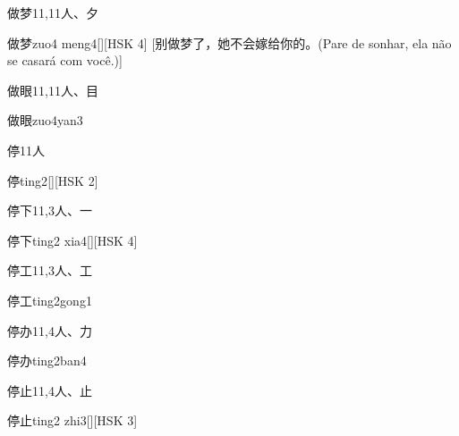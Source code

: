\begin{entry}{做梦}{11,11}{⼈、⼣}
  \begin{phonetics}{做梦}{zuo4 meng4}[][HSK 4]
    [别​做​梦​了​，她​不​会​嫁​给​你​的​。(Pare de sonhar, ela não se casará com você.)]
  \end{phonetics}
\end{entry}

\begin{entry}{做眼}{11,11}{⼈、⽬}
  \begin{phonetics}{做眼}{zuo4yan3}
  \end{phonetics}
\end{entry}

\begin{entry}{停}{11}{⼈}
  \begin{phonetics}{停}{ting2}[][HSK 2]
  \end{phonetics}
\end{entry}

\begin{entry}{停下}{11,3}{⼈、⼀}
  \begin{phonetics}{停下}{ting2 xia4}[][HSK 4]
  \end{phonetics}
\end{entry}

\begin{entry}{停工}{11,3}{⼈、⼯}
  \begin{phonetics}{停工}{ting2gong1}
  \end{phonetics}
\end{entry}

\begin{entry}{停办}{11,4}{⼈、⼒}
  \begin{phonetics}{停办}{ting2ban4}
  \end{phonetics}
\end{entry}

\begin{entry}{停止}{11,4}{⼈、⽌}
  \begin{phonetics}{停止}{ting2 zhi3}[][HSK 3]
  \end{phonetics}
\end{entry}

